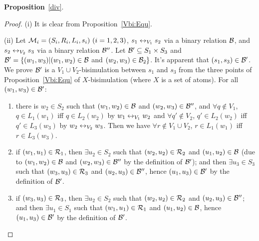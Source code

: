 \documentclass{article}
\begin{document}
\textbf{Proposition}~\ref{div}.
\begin{proof}
(i) It is clear from Proposition~\ref{Vbi:Equ}.

(ii) Let ${\cal M}_i=(S_i,R_i,L_i,s_i)~(i=1,2,3)$, $s_1 \leftrightarrow_{V_1} s_2$ via a binary relation ${\cal B}$, and $s_2 \leftrightarrow_{V_2} s_3$ via a binary relation ${\cal B}''$. Let ${\cal B}' \subseteq S_1 \times S_3$ and ${\cal B}' = \{(w_1, w_3)| (w_1, w_2)\in {\cal B}$ and $(w_2, w_3)\in {\cal B}_2\}$. It's apparent that $(s_1, s_3) \in {\cal B}'$. We prove ${\cal B}'$ is a $V_1 \cup V_2$-bisimulation between $s_1$ and $s_3$ from the three points of Proposition~\ref{Vbi:Equ} of $X$-bisimulation (where $X$ is a set of atoms). For all $(w_1, w_3) \in {\cal B}'$:
\begin{enumerate}[(1)]
  \item there is $w_2 \in S_2$ such that $(w_1,w_2)\in {\cal B}$ and $(w_2, w_3)\in {\cal B}''$, and $\forall q \notin V_1$, $q \in L_1(w_1)$ iff $q \in L_2(w_2)$ by $w_1 \leftrightarrow_{V_1} w_2$ and $\forall q' \notin V_2$, $q'\in L_2(w_2)$ iff $q'\in L_3(w_3)$ by $w_2 \leftrightarrow_{V_2} w_3$. Then we have $\forall r\notin V_1 \cup V_2$, $r \in L_1(w_1)$ iff $r \in L_3(w_3)$.
  \item if $(w_1, u_1) \in {\cal R}_1$, then $\exists u_2\in S_2$ such that $(w_2, u_2) \in {\cal R}_2$ and $(u_1,u_2)\in {\cal B}$ (due to $(w_1,w_2)\in {\cal B}$ and $(w_2, w_3) \in {\cal B}''$ by the definition of ${\cal B}'$); and then $\exists u_3 \in S_3$ such that $(w_3, u_3) \in {\cal R}_3$ and $(u_2, u_3) \in {\cal B}''$, hence $(u_1, u_3) \in {\cal B}'$ by the definition of ${\cal B}'$.
  \item if $(w_3, u_3) \in {\cal R}_3$, then $\exists u_2\in S_2$ such that $(w_2, u_2) \in {\cal R}_2$ and $(u_2, u_3) \in {\cal B}''$; and then $\exists u_1 \in S_1$ such that $(w_1, u_1) \in {\cal R}_1$ and $(u_1, u_2) \in {\cal B}$, hence $(u_1, u_3)\in {\cal B}'$ by the definition of ${\cal B}'$.
\end{enumerate}
\end{proof}
\end{document}

